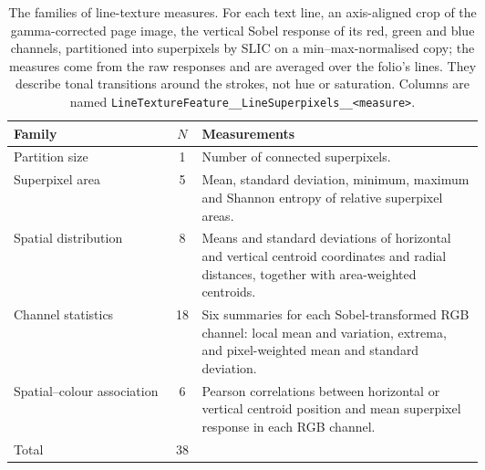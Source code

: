\begin{table}[htbp]
  \centering
  \caption{The families of line-texture measures. For each text line, an axis-aligned crop of the gamma-corrected page image, the vertical Sobel response of its red, green and blue channels, partitioned into superpixels by SLIC on a min--max-normalised copy; the measures come from the raw responses and are averaged over the folio's lines. They describe tonal transitions around the strokes, not hue or saturation. Columns are named \texttt{LineTextureFeature\_\_LineSuperpixels\_\_<measure>}.}
  \label{tab:line_texture_families}
  \begin{tabular}{lcp{0.6\linewidth}}
    \toprule
    Family & $N$ & Measurements \\
    \midrule
    Partition size & 1 & Number of connected superpixels. \\
    Superpixel area & 5 & Mean, standard deviation, minimum, maximum and Shannon entropy of relative superpixel areas. \\
    Spatial distribution & 8 & Means and standard deviations of horizontal and vertical centroid coordinates and radial distances, together with area-weighted centroids. \\
    Channel statistics & 18 & Six summaries for each Sobel-transformed RGB channel: local mean and variation, extrema, and pixel-weighted mean and standard deviation. \\
    Spatial--colour association & 6 & Pearson correlations between horizontal or vertical centroid position and mean superpixel response in each RGB channel. \\
    \midrule
    Total & 38 &  \\
    \bottomrule
  \end{tabular}
\end{table}
